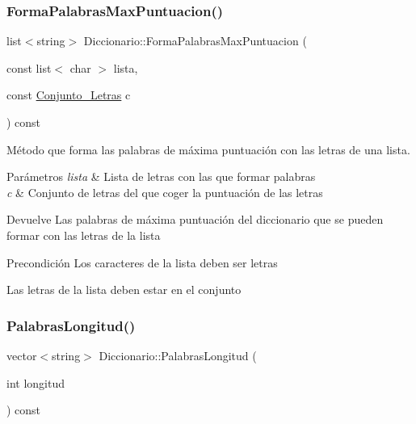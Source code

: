 \subsubsection{\texorpdfstring{Forma\+Palabras\+Max\+Puntuacion()}{FormaPalabrasMaxPuntuacion()}}
{\footnotesize\ttfamily list$<$string$>$ Diccionario\+::\+Forma\+Palabras\+Max\+Puntuacion (\begin{DoxyParamCaption}\item[{const list$<$ char $>$}]{lista,  }\item[{const \hyperlink{classConjunto__Letras}{Conjunto\+\_\+\+Letras}}]{c }\end{DoxyParamCaption}) const}



Método que forma las palabras de máxima puntuación con las letras de una lista. 


\begin{DoxyParams}{Parámetros}
{\em lista} & Lista de letras con las que formar palabras \\
\hline
{\em c} & Conjunto de letras del que coger la puntuación de las letras \\
\hline
\end{DoxyParams}
\begin{DoxyReturn}{Devuelve}
Las palabras de máxima puntuación del diccionario que se pueden formar con las letras de la lista 
\end{DoxyReturn}
\begin{DoxyPrecond}{Precondición}
Los caracteres de la lista deben ser letras 

Las letras de la lista deben estar en el conjunto 
\end{DoxyPrecond}
\mbox{\label{classDiccionario_a66cf11b04fcfea08bf292f7ecbc4e376}} 
\subsubsection{\texorpdfstring{Palabras\+Longitud()}{PalabrasLongitud()}}
{\footnotesize\ttfamily vector$<$string$>$ Diccionario\+::\+Palabras\+Longitud (\begin{DoxyParamCaption}\item[{int}]{longitud }\end{DoxyParamCaption}) const}



